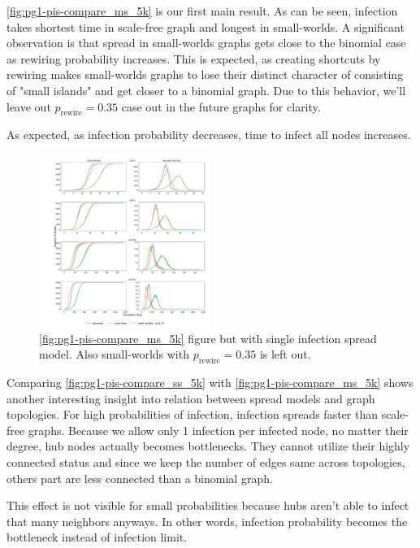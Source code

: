 \documentclass[conference]{IEEEtran}
\begin{document}
\autoref{fig:pg1-pis-compare_ms_5k} is our first main result. As can be seen, infection takes shortest time in scale-free graph and longest in small-worlds. A significant observation is that spread in small-worlds graphs gets close to the binomial case as rewiring probability increases. This is expected, as creating shortcuts by rewiring makes small-worlds graphs to lose their distinct character of consisting of "small islands" and get closer to a binomial graph. Due to this behavior, we'll leave out $p_{\text{rewire}}=0.35$ case out in the future graphs for clarity.

As expected, as infection probability decreases, time to infect all nodes increases.

\begin{figure}[htb]
  \begin{center}
	\includegraphics[width=0.5\textwidth]{img/pg1-pis-compare_ss_5k.pdf}
  \end{center}
	\caption{\autoref{fig:pg1-pis-compare_ms_5k} figure but with single infection spread model. Also small-worlds with $p_{\text{rewire}}=0.35$ is left out.}
	\label{fig:pg1-pis-compare_ss_5k}
\end{figure}

Comparing \autoref{fig:pg1-pis-compare_ss_5k} with \autoref{fig:pg1-pis-compare_ms_5k} shows another interesting insight into relation between spread models and graph topologies. For high probabilities of infection, infection spreads faster than scale-free graphs. Because we allow only 1 infection per infected node, no matter their degree, hub nodes actually becomes bottlenecks. They cannot utilize their highly connected status and since we keep the number of edges same across topologies, others part are less connected than a binomial graph.

This effect is not visible for small probabilities because hubs aren't able to infect that many neighbors anyways. In other words, infection probability becomes the bottleneck instead of infection limit.
\end{document}
